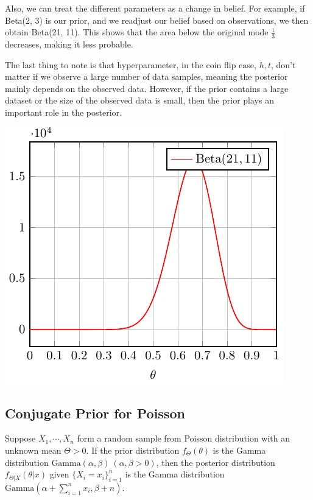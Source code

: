 \begin{minipage}{0.5\textwidth}
  Also, we can treat the different parameters as a change in belief. For example, if Beta(2, 3) is our prior, and we readjust our belief based on observations, we then obtain Beta(21, 11). This shows that the area below the original mode \(\frac{1}{3}\) decreases, making it less probable. 

  The last thing to note is that hyperparameter, in the coin flip case, \(h, t\), don’t matter if we observe a large number of data samples, meaning the posterior mainly depends on the observed data. However, if the prior contains a large dataset or the size of the observed data is small, then the prior plays an important role in the posterior. 
\end{minipage}
\begin{minipage}{0.5\textwidth}
  \includegraphics{Figures/Beta_21_11.pdf}
\end{minipage}

\subsection{Conjugate Prior for Poisson}
\begin{definition}
  Suppose \(X_1, \cdots, X_n\) form a random sample from Poisson distribution with an unknown mean \(\Theta > 0\). If the prior distribution \(f_{\Theta}(\theta)\) is the Gamma distribution \(\text{Gamma}(\alpha, \beta)\ (\alpha, \beta >0)\), then the posterior distribution \(f_{\Theta \vert X} (\theta \vert x)\) given \(\{X_i = x_i\}_{i=1} ^n\) is the Gamma distribution \(\text{Gamma}(\alpha + \sum_{i = 1}^n x_i, \beta + n)\). 
\end{definition}

